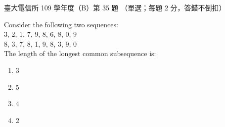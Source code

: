 \begin{pastexam}[label={px:ntu-109-comm-dsa-35}]{臺大電信所 109 學年度（B）第 35 題}
（單選；每題 2 分，答錯不倒扣）

Consider the following two sequences:\\
3, 2, 1, 7, 9, 8, 6, 8, 0, 9\\
8, 3, 7, 8, 1, 9, 8, 3, 9, 0\\
The length of the longest common subsequence is:
\begin{enumerate}[label=(\Alph*)]
\item 3
\item 5
\item 4
\item 2
\end{enumerate}
\end{pastexam}

